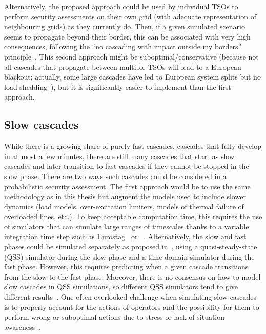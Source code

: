 Alternatively, the proposed approach could be used by individual TSOs to perform security assessments on their own grid (with adequate representation of neighbouring grids) as they currently do. Then, if a given simulated scenario seems to propagate beyond their border, this can be associated with very high consequences, following the ``no cascading with impact outside my borders'' principle~\cite{UCTE_Probabilistic}. This second approach might be suboptimal/conservative (because not all cascades that propagate between multiple TSOs will lead to a European blackout; actually, some large cascades have led to European system splits but no load shedding~\cite{ENTSOESplitJan2021}), but it is significantly easier to implement than the first approach.


\subsection*{Slow cascades}

While there is a growing share of purely-fast cascades, \ie cascades that fully develop in at most a few minutes, there are still many cascades that start as slow cascades and later transition to fast cascades if they cannot be stopped in the slow phase. There are two ways such cascades could be considered in a probabilistic security assessment. The first approach would be to use the same methodology as in this thesis but augment the models used to include slower dynamics (load models, over-excitation limiters, models of thermal failure of overloaded lines, etc.). To keep acceptable computation time, this requires the use of simulators that can simulate large ranges of timescales thanks to a variable integration time step such as Eurostag~\cite{STAG} or \Dynawo{}~\cite{Dynawo}. Alternatively, the slow and fast phases could be simulated separately as proposed in~\cite{TwoLevelPSA}, using a quasi-steady-state (QSS) simulator during the slow phase and a time-domain simulator during the fast phase. However, this requires predicting when a given cascade transitions from the slow to the fast phase. Moreover, there is no consensus on how to model slow cascades in QSS simulations, so different QSS simulators tend to give different results~\cite{Benchmarking2018}. One often overlooked challenge when simulating slow cascades is to properly account for the actions of operators and the possibility for them to perform wrong or suboptimal actions due to stress or lack of situation awareness~\cite{Shahab_HRA, Panteli_Awareness}.

